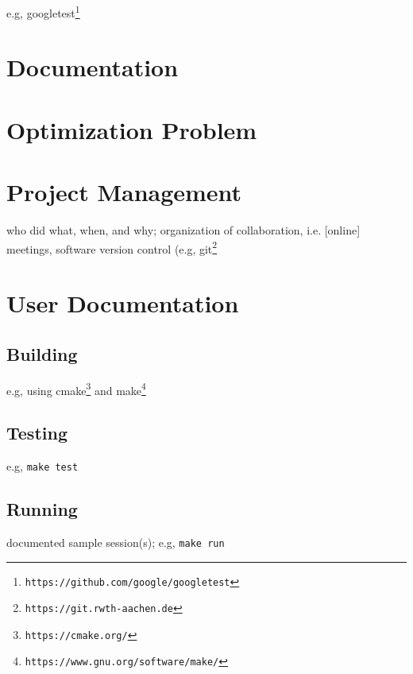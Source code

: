 \documentclass{article}
\begin{document}
e.g, googletest\footnote{\tt https://github.com/google/googletest}

\section{Documentation}\label{ch:doc}

\section{Optimization Problem}\label{ch:optimization-problem}


\section{Project Management} \label{ch:projectmanagement}

who did what, when, and why; organization of collaboration, i.e. [online] meetings, software version control (e.g, git\footnote{\tt https://git.rwth-aachen.de}




\appendix

\section{User Documentation} \label{ch:userdoc}

\subsection{Building}

e.g, using cmake\footnote{\tt https://cmake.org/} and make\footnote{\tt https://www.gnu.org/software/make/}


\subsection{Testing}

e.g, \verb!make test!

\subsection{Running}

documented sample session(s); e.g, \verb!make run!
\end{document}
